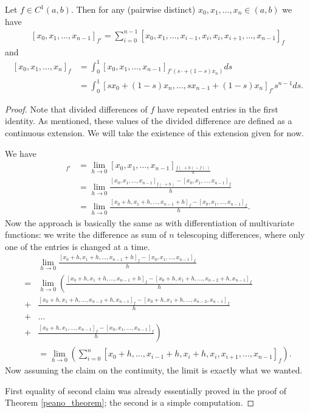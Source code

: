 \begin{lem}
	Let $f \in C^{1}(a, b)$. Then for any (pairwise distinct) $x_{0}, x_{1}, \ldots, x_{n} \in (a, b)$ we have
	\begin{align}\label{derivative_divdif}
		[x_{0}, x_{1}, \ldots, x_{n - 1}]_{f'} = \sum_{i = 0}^{n - 1} [x_{0}, x_{1}, \ldots, x_{i - 1}, x_{i}, x_{i}, x_{i + 1}, \ldots, x_{n - 1}]_{f}
	\end{align}
	and
	\begin{align}\label{integral_divdif}
		[x_{0}, x_{1}, \ldots, x_{n}]_{f} &= \int_{0}^{1} [x_{0}, x_{1}, \ldots, x_{n - 1}]_{f'(s \cdot + (1 - s) x_{n})} ds \\
		&= \int_{0}^{1} [s x_{0} + (1 - s) x_{n}, \ldots, s x_{n - 1} + (1 - s) x_{n}]_{f'} s^{n - 1} d s \nonumber.
	\end{align}
\end{lem}
\begin{proof}
	Note that divided differences of $f$ have repeated entries in the first identity. As mentioned, these values of the divided difference are defined as a continuous extension. We will take the existence of this extension given for now.

	We have
	\begin{align*}
		[x_{0}, x_{1}, \ldots, x_{n - 1}]_{f'} &= \lim_{h \to 0} [x_{0}, x_{1}, \ldots, x_{n - 1}]_{\frac{f(\cdot + h) - f(\cdot)}{h}} \\
		&= \lim_{h \to 0} \frac{[x_{0}, x_{1}, \ldots, x_{n - 1}]_{f(\cdot + h)} -[x_{0}, x_{1}, \ldots, x_{n - 1}]_{f}}{h} \\
		&= \lim_{h \to 0} \frac{[x_{0} + h, x_{1} + h, \ldots, x_{n - 1} + h]_{f} -[x_{0}, x_{1}, \ldots, x_{n - 1}]_{f}}{h}.
	\end{align*}
	Now the approach is basically the same as with differentiation of multivariate functions: we write the difference as sum of $n$ telescoping differences, where only one of the entries is changed at a time.
	\begin{align*}
		& \lim_{h \to 0} \frac{[x_{0} + h, x_{1} + h, \ldots, x_{n - 1} + h]_{f} -[x_{0}, x_{1}, \ldots, x_{n - 1}]_{f}}{h} \\
		=& \lim_{h \to 0} \left(\frac{[x_{0} + h, x_{1} + h, \ldots, x_{n - 1} + h]_{f} - [x_{0} + h, x_{1} + h, \ldots, x_{n - 2} + h,  x_{n - 1}]_{f}}{h} \right. \\
		+& \frac{[x_{0} + h, x_{1} + h, \ldots, x_{n - 2} + h, x_{n - 1}]_{f} - [x_{0} + h, x_{1} + h, \ldots, x_{n - 2}, x_{n - 1}]_{f}}{h} \\
		+& \ldots \\
		+& \left. \frac{[x_{0} + h, x_{1}, \ldots, x_{n - 1}]_{f} - [x_{0}, x_{1}, \ldots, x_{n - 1}]_{f}}{h} \right)\\
		&= \lim_{h \to 0} \left(\sum_{i = 0}^{n} [x_{0} + h, \ldots, x_{i - 1} + h, x_{i} + h, x_{i}, x_{i + 1}, \ldots, x_{n - 1}]_{f} \right).
	\end{align*}
	Now assuming the claim on the continuity, the limit is exactly what we wanted.

	First equality of second claim was already essentially proved in the proof of Theorem \ref{peano_theorem}; the second is a simple computation.
\end{proof}

